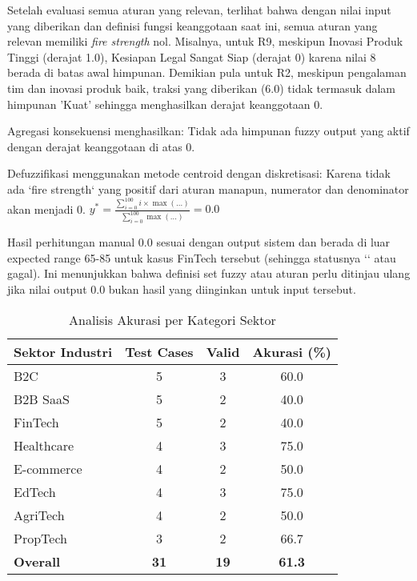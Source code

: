 \documentclass[12pt,a4paper]{article}
\begin{document}
Setelah evaluasi semua aturan yang relevan, terlihat bahwa dengan nilai input yang diberikan dan definisi fungsi keanggotaan saat ini, semua aturan yang relevan memiliki \textit{fire strength} nol.
Misalnya, untuk R9, meskipun Inovasi Produk Tinggi (derajat 1.0), Kesiapan Legal Sangat Siap (derajat 0) karena nilai 8 berada di batas awal himpunan. Demikian pula untuk R2, meskipun pengalaman tim dan inovasi produk baik, traksi yang diberikan (6.0) tidak termasuk dalam himpunan 'Kuat' sehingga menghasilkan derajat keanggotaan 0.

Agregasi konsekuensi menghasilkan:
Tidak ada himpunan fuzzy output yang aktif dengan derajat keanggotaan di atas 0.

Defuzzifikasi menggunakan metode centroid dengan diskretisasi:
Karena tidak ada `fire strength` yang positif dari aturan manapun, numerator dan denominator akan menjadi 0.
$y^* = \frac{\sum_{i=0}^{100} i \times \max(\dots)}{\sum_{i=0}^{100} \max(\dots)} = 0.0$

Hasil perhitungan manual 0.0 sesuai dengan output sistem dan berada di luar expected range 65-85 untuk kasus FinTech tersebut (sehingga statusnya `` atau gagal). Ini menunjukkan bahwa definisi set fuzzy atau aturan perlu ditinjau ulang jika nilai output 0.0 bukan hasil yang diinginkan untuk input tersebut.

\begin{table}[htbp] %
\centering
\caption{Analisis Akurasi per Kategori Sektor}
\label{tab:sector-accuracy}
\begin{tabular}{@{}lccc@{}}
\toprule
\textbf{Sektor Industri} & \textbf{Test Cases} & \textbf{Valid} & \textbf{Akurasi (\%)} \\
\midrule
B2C & 5 & 3 & 60.0 \\ %
B2B SaaS & 5 & 2 & 40.0 \\ %
FinTech & 5 & 2 & 40.0 \\ %
Healthcare & 4 & 3 & 75.0 \\ %
E-commerce & 4 & 2 & 50.0 \\ %
EdTech & 4 & 3 & 75.0 \\ %
AgriTech & 4 & 2 & 50.0 \\ %
PropTech & 3 & 2 & 66.7 \\ %
\midrule
\textbf{Overall} & \textbf{31} & \textbf{19} & \textbf{61.3} \\
\bottomrule
\end{tabular}
\end{table}
\end{document}
